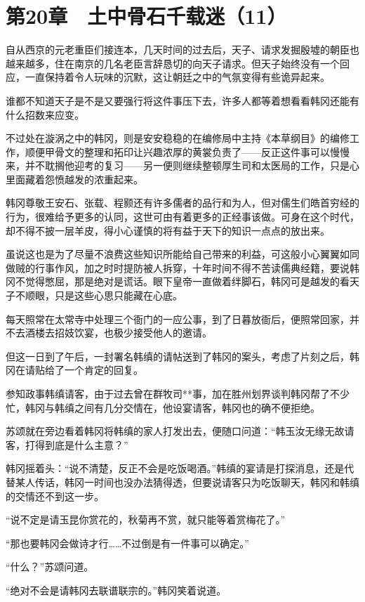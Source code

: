 \section{第20章　土中骨石千载迷（11）}

自从西京的元老重臣们接连本，几天时间的过去后，天子、请求发掘殷墟的朝臣也越来越多，住在南京的几名老臣言辞恳切的向天子请求。但天子始终没有一个回应，一直保持着令人玩味的沉默，这让朝廷之中的气氛变得有些诡异起来。

谁都不知道天子是不是又要强行将这件事压下去，许多人都等着想看看韩冈还能有什么招数来应变。

不过处在漩涡之中的韩冈，则是安安稳稳的在编修局中主持《本草纲目》的编修工作，顺便甲骨文的整理和拓印让兴趣浓厚的黄裳负责了——反正这件事可以慢慢来，并不耽搁他迎考的复习——另一便则继续整顿厚生司和太医局的工作，只是心里面藏着怨愤越发的浓重起来。

韩冈尊敬王安石、张载、程颢还有许多儒者的品行和为人，但对儒生们皓首穷经的行为，很难给予更多的认同，这世可由有着更多的正经事该做。可身在这个时代，却不得不披一层羊皮，得小心谨慎的将有益于天下的知识一点点的放出来。

虽说这也是为了尽量不浪费这些知识所能给自己带来的利益，可这般小心翼翼如同做贼的行事作风，加之时时提防被人拆穿，十年时间不得不苦读儒典经籍，要说韩冈不觉得憋屈，那是绝对是谎话。眼下皇帝一直做着绊脚石，韩冈可是越发的看天子不顺眼，只是这些心思只能藏在心底。

每天照常在太常寺中处理三个衙门的一应公事，到了日暮放衙后，便照常回家，并不去酒楼去招妓饮宴，也极少接受他人的邀请。

但这一日到了午后，一封署名韩缜的请帖送到了韩冈的案头，考虑了片刻之后，韩冈在请贴给了一个肯定的回复。

参知政事韩缜请客，由于过去曾在群牧司**事，加在胜州划界谈判韩冈帮了不少忙，韩冈与韩缜之间有几分交情在，他设宴请客，韩冈也的确不便拒绝。

苏颂就在旁边看着韩冈将韩缜的家人打发出去，便随口问道：“韩玉汝无缘无故请客，打得到底是什么主意？”

韩冈摇着头：“说不清楚，反正不会是吃饭喝酒。”韩缜的宴请是打探消息，还是代替某人传话，韩冈一时间也没办法猜得透，但要说请客只为吃饭聊天，韩冈和韩缜的交情还不到这一步。

“说不定是请玉昆你赏花的，秋菊再不赏，就只能等着赏梅花了。”

“那也要韩冈会做诗才行……不过倒是有一件事可以确定。”

“什么？”苏颂问道。

“绝对不会是请韩冈去联谱联宗的。”韩冈笑着说道。

